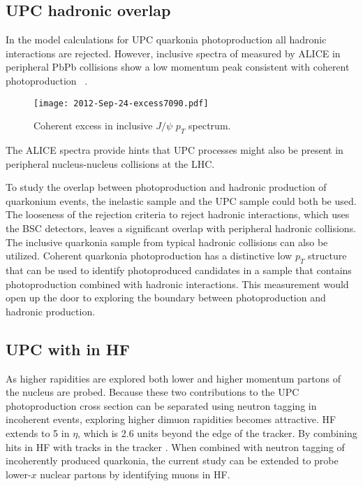     \subsection{UPC hadronic overlap}
      In the model calculations for UPC quarkonia 
        photoproduction all hadronic interactions are rejected.
      However, inclusive \pt{} spectra of \JPsi{} measured by ALICE in 
        peripheral PbPb collisions show a low momentum peak consistent with 
        coherent photoproduction ~\cite{aliceIclJpsi}.
      \begin{figure}[h]
        \centering
        \texttt{[image: 2012-Sep-24-excess7090.pdf]}
        \caption{Coherent excess in inclusive $J/\psi$ $p_{T}$ spectrum.}
        \label{fig:alicePtSpecLowPt}
      \end{figure}
      The ALICE spectra provide hints that UPC processes might also be present 
        in peripheral nucleus-nucleus collisions at the LHC.

      To study the overlap between photoproduction and hadronic production of 
        quarkonium events, the inelastic sample and the UPC sample could both be
        used. 
      The looseness of the rejection criteria to reject hadronic interactions,
        which uses the BSC detectors, leaves a significant overlap with 
        peripheral hadronic collisions. 
      The inclusive quarkonia sample from typical hadronic collisions can also 
        be utilized. 
      Coherent quarkonia photoproduction has a distinctive low $p_{T}$ structure
        that can be used to identify photoproduced candidates in a sample that 
        contains photoproduction combined with hadronic interactions.
      This measurement would open up the door to exploring the boundary between
        photoproduction and hadronic production.

    \subsection{UPC \JPsi{} with \DIFdelbegin {}\DIFdelend \DIFaddbegin {}\DIFaddend in HF}
      As higher rapidities are explored both lower and higher momentum partons
        of the nucleus are probed. 
      Because these two contributions to the UPC photoproduction cross section 
        can be separated using neutron tagging in incoherent events, exploring
        higher dimuon rapidities becomes attractive.
      HF extends to 5 in $\eta$, which is 2.6 units beyond the edge of the 
        tracker.
      By combining hits in HF with tracks in the tracker\DIFdelbegin {}\DIFdelend \DIFaddbegin \DIFadd{,  
        }\JPsi{} \DIFaddend . 
      When combined with neutron tagging of incoherently produced quarkonia,
        the current study can be extended to probe lower-$x$ nuclear partons 
        by identifying muons in HF. 

